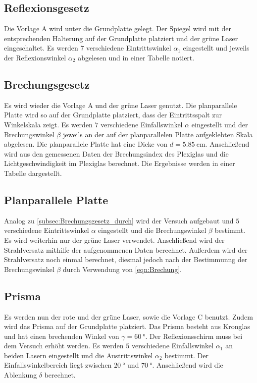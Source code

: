 \subsection{Reflexionsgesetz}
\label{subsec:Reflexionsgesetz_durch}

Die Vorlage A wird unter die Grundplatte gelegt. Der Spiegel wird mit der entsprechenden Halterung auf der Grundplatte platziert und
der grüne Laser eingeschaltet. Es werden $7$ verschiedene Eintrittswinkel $\alpha_1$ eingestellt und jeweils der Reflexionswinkel $\alpha_2$
abgelesen und in einer Tabelle notiert.

\subsection{Brechungsgesetz}
\label{subsec:Brechungsgesetz_durch}

Es wird wieder die Vorlage A und der grüne Laser genutzt. Die planparallele Platte wird so auf der Grundplatte platziert, dass der
Eintrittsspalt zur Winkelskala zeigt.
Es werden $7$ verschiedene Einfallswinkel $\alpha$ eingestellt und der Brechungswinkel $\beta$ jeweils an der auf der planparallelen 
Platte aufgeklebten Skala abgelesen.
Die planparallele Platte hat eine Dicke von $d=\qty{5.85}{\centi\meter}$. Anschließend wird aus den gemessenen Daten der Brechungsindex des Plexiglas und die
Lichtgeschwindigkeit im Plexiglas berechnet. Die Ergebnisse werden in einer Tabelle dargestellt.

\subsection{Planparallele Platte}
\label{subsec:Planparallel_durch}

Analog zu \autoref{subsec:Brechungsgesetz_durch} wird der Versuch aufgebaut und $5$ verschiedene Eintrittswinkel $\alpha$ eingestellt
und die Brechungswinkel $\beta$ bestimmt.
Es wird weiterhin nur der grüne Laser verwendet.
Anschließend wird der Strahlversatz mithilfe der aufgenommenen Daten berechnet.
Außerdem wird der Strahlversatz noch einmal berechnet, diesmal jedoch nach der Bestimmunng der Brechungswinkel $\beta$ durch Verwendung
von \autoref{eqn:Brechung}. 


\subsection{Prisma}
\label{subsec:Prisma_durch}
Es werden nun der rote und der grüne Laser, sowie die Vorlage C benutzt. Zudem wird das Prisma auf der Grundplatte platziert.
Das Prisma besteht aus Kronglas und hat einen brechenden Winkel von $\gamma = \qty{60}{\degree}$.
Der Reflexionsschirm muss bei dem Versuch erhöht werden.
Es werden $5$ verschiedene Einfallswinkel $\alpha_1$ an beiden Lasern eingestellt und die Austrittswinkel $\alpha_2$ bestimmt.
Der Einfallswinkelbereich liegt zwischen $\qty{20}{\degree}$ und $\qty{70}{\degree}$.
Anschließend wird die Ablenkung $\delta$ berechnet.


